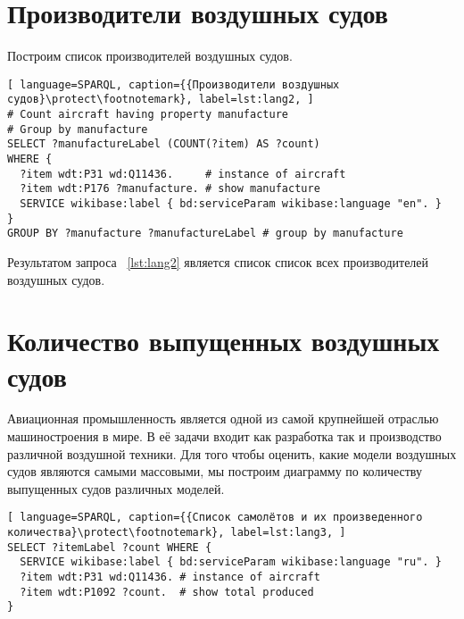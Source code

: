 \section{Производители воздушных судов}

Построим список производителей воздушных судов.

\begin{lstlisting}[ language=SPARQL, caption={{Производители воздушных судов}\protect\footnotemark}, label=lst:lang2, ]
# Count aircraft having property manufacture
# Group by manufacture
SELECT ?manufactureLabel (COUNT(?item) AS ?count) 
WHERE {
  ?item wdt:P31 wd:Q11436.     # instance of aircraft
  ?item wdt:P176 ?manufacture. # show manufacture
  SERVICE wikibase:label { bd:serviceParam wikibase:language "en". }
}
GROUP BY ?manufacture ?manufactureLabel # group by manufacture
\end{lstlisting}

Результатом запроса ~\ref{lst:lang2} является список список всех производителей воздушных судов. 

\section{Количество выпущенных воздушных судов}

Авиационная промышленность является одной из самой крупнейшей отраслью машиностроения в мире. 
В её задачи входит как разработка так и производство различной воздушной техники. 
Для того чтобы оценить, какие модели воздушных судов являются самыми массовыми, 
мы построим диаграмму по количеству выпущенных судов различных моделей.

\begin{lstlisting}[ language=SPARQL, caption={{Список самолётов и их произведенного количества}\protect\footnotemark}, label=lst:lang3, ]
SELECT ?itemLabel ?count WHERE {
  SERVICE wikibase:label { bd:serviceParam wikibase:language "ru". }
  ?item wdt:P31 wd:Q11436. # instance of aircraft
  ?item wdt:P1092 ?count.  # show total produced
}
\end{lstlisting}


